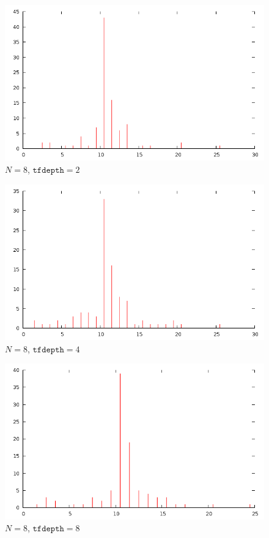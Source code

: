 \documentclass[12pt]{article}
\begin{document}
\begin{figure}[H]
\centering
\caption{$N=8$, $\texttt{tfdepth}=2$}
\includegraphics[scale=0.6]{times8-2.png}
\end{figure} 

\begin{figure}[H]
\centering
\caption{$N=8$, $\texttt{tfdepth}=4$}
\includegraphics[scale=0.6]{times8-4.png}
\end{figure} 

\begin{figure}[H]
\centering
\caption{$N=8$, $\texttt{tfdepth}=8$}
\includegraphics[scale=0.6]{times8-8.png}
\end{figure} 
\end{document}
